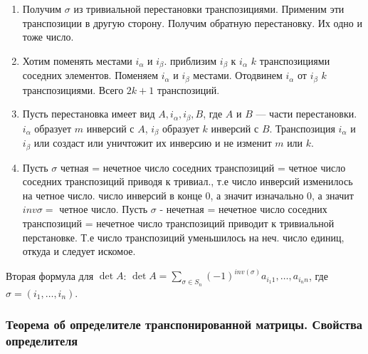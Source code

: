 \begin{enumerate}
    \item Получим \(\sigma\) из тривиальной перестановки транспозициями. Применим эти транспозиции в другую сторону. Получим обратную перестановку. Их одно и тоже число.
    \item Хотим поменять местами \(i_\alpha\) и \(i_\beta\). приблизим \(i_\beta\) к \(i_\alpha\) \(k\) транспозициями соседних элементов. Поменяем \(i_\alpha\) и \(i_\beta\) местами. Отодвинем \(i_\alpha\) от \(i_\beta\) \(k\) транспозициями. Всего \(2k + 1\) транспозиций.
    \item Пусть перестановка имеет вид \(A, i_\alpha, i_\beta, B\), где \(A\) и \(B\) --- части перестановки. \(i_\alpha\) образует \(m\) инверсий с \(A\), \(i_\beta\) образует \(k\) инверсий с \(B\). Транспозиция  \(i_\alpha\) и \(i_\beta\) или создаст или уничтожит их инверсию и не изменит \(m\) или \(k\).
    \item  Пусть \(\sigma\) четная = нечетное число соседних транспозиций = четное число  соседних транспозиций приводя к тривиал., т.е число инверсий изменилось на четное число. число инверсий в конце 0, а значит изначально 0, а значит \(inv \sigma =\) четное число. Пусть \( \sigma\) - нечетная = нечетное число соседних транспозиций = нечетное число транспозиций приводит  к тривиальной перстановке. Т.е число транспозиций уменьшилось на неч. число единиц, откуда и следует искомое. %
\end{enumerate}

Вторая формула для \(\det A\): \(\det A = \sum\limits_{\sigma \in S_n} (-1)^{inv(\sigma)} a_{i_1 1}, \ldots, a_{i_n n}\), где \(\sigma = (i_1, \ldots, i_n)\).

\subsubsection{Теорема об определителе транспонированной матрицы. Свойства определителя}

